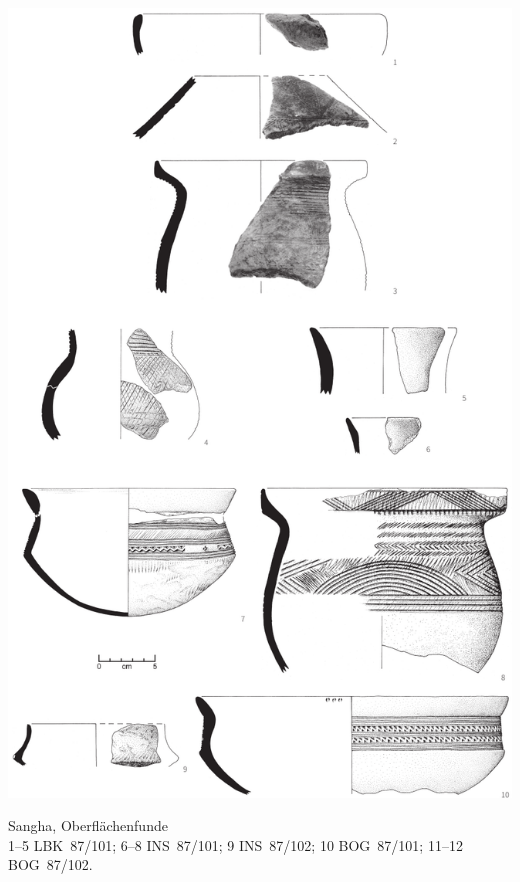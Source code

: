 \begin{pl}[H]
	\includegraphics{plt/Taf40.pdf}
	\vspace{.75em}\caption{\mbox{Sangha}, Oberflächenfunde \\ 1--5 LBK~87/101; 6--8 INS~87/101; 9 INS~87/102; 10 BOG~87/101; 11--12 BOG~87/102.}
	\label{pl:40}
\end{pl}

